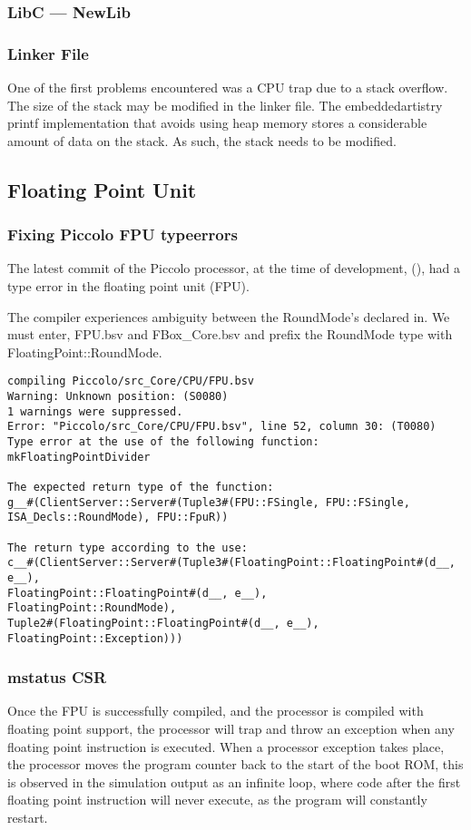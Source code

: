 \documentclass[a4paper,9pt]{report}
\begin{document}
\subsubsection{LibC --- NewLib}


\subsubsection{Linker File}

One of the first problems encountered was a CPU trap due to a stack overflow.
The size of the stack may be modified in the linker file. The embeddedartistry
printf implementation that avoids using heap memory stores a considerable amount
of data on the stack. As such, the stack needs to be modified.   


\subsection{Floating Point Unit}
\subsubsection{Fixing Piccolo FPU typeerrors}
The latest commit of the Piccolo processor, at the time of development, (), had
a type error in the floating point unit (FPU). 

The compiler experiences ambiguity between the RoundMode's declared in. We must enter, FPU.bsv and FBox\_Core.bsv and prefix the RoundMode type with FloatingPoint::RoundMode.

\begin{verbatim}
compiling Piccolo/src_Core/CPU/FPU.bsv
Warning: Unknown position: (S0080)
1 warnings were suppressed.
Error: "Piccolo/src_Core/CPU/FPU.bsv", line 52, column 30: (T0080)
Type error at the use of the following function:
mkFloatingPointDivider

The expected return type of the function:
g__#(ClientServer::Server#(Tuple3#(FPU::FSingle, FPU::FSingle, ISA_Decls::RoundMode), FPU::FpuR))

The return type according to the use:
c__#(ClientServer::Server#(Tuple3#(FloatingPoint::FloatingPoint#(d__, e__),
FloatingPoint::FloatingPoint#(d__, e__),
FloatingPoint::RoundMode),
Tuple2#(FloatingPoint::FloatingPoint#(d__, e__), FloatingPoint::Exception)))
\end{verbatim}

\subsubsection{mstatus CSR}
Once the FPU is successfully compiled, and the processor is compiled with
floating point support, the processor will trap and throw an exception when any
floating point instruction is executed. When a processor exception takes place,
the processor moves the program counter back to the start of the boot ROM, this
is observed in the simulation output as an infinite loop, where code after the
first floating point instruction will never execute, as the program will
constantly restart.
\end{document}
